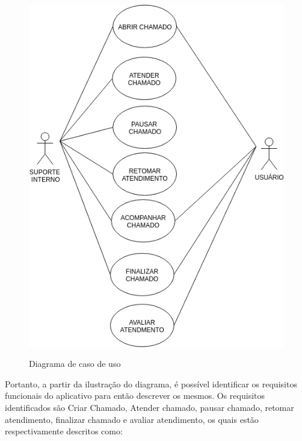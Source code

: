 \begin{figure}[htb]
     \caption{Diagrama de caso de uso}
     \centering
     \begin{frame}{
     \includegraphics [scale = 0.7]{img/Diagramas/diagrama_caso_de_uso.png}}
     \end{frame}
     \label{fig:diagrama_caso_de_uso}
 \end{figure}
\newpage
Portanto, a partir da ilustração do diagrama, é possível identificar os requisitos funcionais do aplicativo para  então descrever os mesmos. Os requisitos identificados são Criar Chamado, Atender chamado, pausar chamado, retomar atendimento, finalizar chamado e avaliar atendimento, os quais estão respectivamente descritos como:\\

